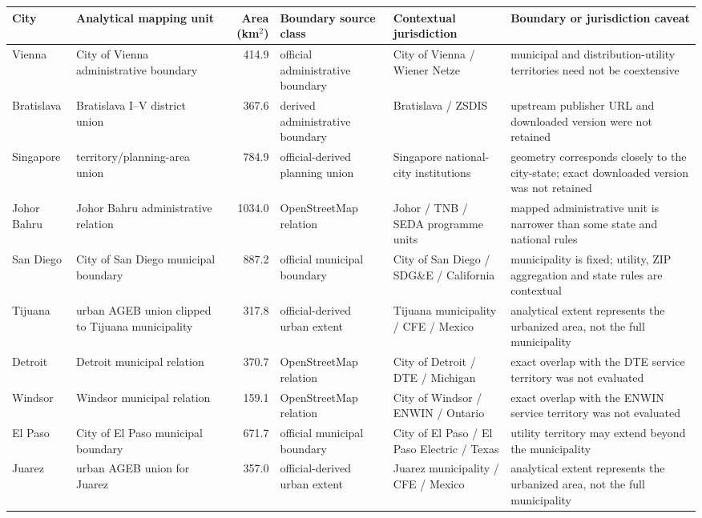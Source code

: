 \begin{tabular}{@{}>{\raggedright\arraybackslash}p{1.15cm}>{\raggedright\arraybackslash}p{3.0cm}r>{\raggedright\arraybackslash}p{2.75cm}>{\raggedright\arraybackslash}p{3.0cm}>{\raggedright\arraybackslash}p{3.35cm}@{}}
\toprule
City & Analytical mapping unit & Area (km$^2$) & Boundary source class & Contextual jurisdiction & Boundary or jurisdiction caveat \\
\midrule
Vienna & City of Vienna administrative boundary & 414.9 & official administrative boundary & City of Vienna / Wiener Netze & municipal and distribution-utility territories need not be coextensive \\
Bratislava & Bratislava I--V district union & 367.6 & derived administrative boundary & Bratislava / ZSDIS & upstream publisher URL and downloaded version were not retained \\
Singapore & territory/planning-area union & 784.9 & official-derived planning union & Singapore national-city institutions & geometry corresponds closely to the city-state; exact downloaded version was not retained \\
Johor Bahru & Johor Bahru administrative relation & 1034.0 & OpenStreetMap relation & Johor / TNB / SEDA programme units & mapped administrative unit is narrower than some state and national rules \\
San Diego & City of San Diego municipal boundary & 887.2 & official municipal boundary & City of San Diego / SDG\&E / California & municipality is fixed; utility, ZIP aggregation and state rules are contextual \\
Tijuana & urban AGEB union clipped to Tijuana municipality & 317.8 & official-derived urban extent & Tijuana municipality / CFE / Mexico & analytical extent represents the urbanized area, not the full municipality \\
Detroit & Detroit municipal relation & 370.7 & OpenStreetMap relation & City of Detroit / DTE / Michigan & exact overlap with the DTE service territory was not evaluated \\
Windsor & Windsor municipal relation & 159.1 & OpenStreetMap relation & City of Windsor / ENWIN / Ontario & exact overlap with the ENWIN service territory was not evaluated \\
El Paso & City of El Paso municipal boundary & 671.7 & official municipal boundary & City of El Paso / El Paso Electric / Texas & utility territory may extend beyond the municipality \\
Juarez & urban AGEB union for Juarez & 357.0 & official-derived urban extent & Juarez municipality / CFE / Mexico & analytical extent represents the urbanized area, not the full municipality \\

\end{tabular}
